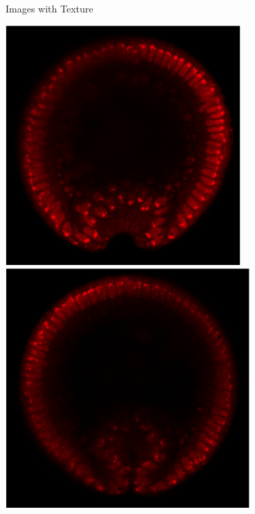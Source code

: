 \documentclass[10pt]{beamer}
\begin{document}
\begin{frame}{Images with Texture}
\begin{center}
\hspace{0.2in}
\includegraphics[width=\imwidth]{nuclei5}
\hspace{0.2in}
\includegraphics[width=\imwidth]{nuclei6}


\end{center}
\end{frame}
\end{document}
